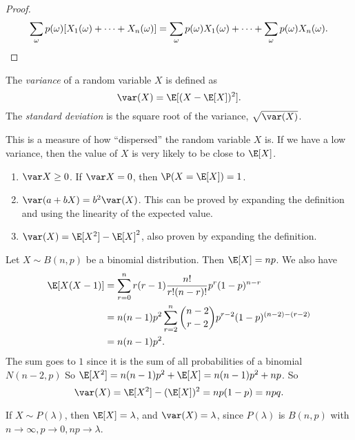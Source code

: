 \documentclass[a4paper]{article}
\begin{document}
\begin{proof}
  \[
    \sum_\omega p(\omega)[X_1(\omega) + \cdots + X_n(\omega)] = \sum_\omega p(\omega)X_1(\omega) + \cdots + \sum_\omega p(\omega) X_n(\omega).\qedhere
  \]
\end{proof}

\begin{defi}
  The \emph{variance} of a random variable $X$ is defined as
  \[
    \var(X) = \E[(X - \E[X])^2].
  \]
  The \emph{standard deviation} is the square root of the variance, $\sqrt{\var(X)}$.
\end{defi}
This is a measure of how ``dispersed'' the random variable $X$ is. If we have a low variance, then the value of $X$ is very likely to be close to $\E[X]$.

\begin{thm}\leavevmode
  \begin{enumerate}
    \item $\var X \geq 0$. If $\var X = 0$, then $\P(X = \E[X]) = 1$.
    \item $\var (a + bX) = b^2 \var(X)$. This can be proved by expanding the definition and using the linearity of the expected value.
    \item $\var(X) = \E[X^2] - \E[X]^2$, also proven by expanding the definition.
  \end{enumerate}
\end{thm}

\begin{eg}
  Let $X\sim B(n, p)$ be a binomial distribution. Then $\E[X] = np$. We also have
  \begin{align*}
    \E[X(X - 1)] &= \sum_{r = 0}^n r(r - 1)\frac{n!}{r!(n - r)!} p^r(1 - p)^{n - r}\\
    &= n(n - 1)p^2\sum_{r = 2}^n \binom{n - 2}{r - 2} p^{r - 2}(1 - p)^{(n - 2) - (r - 2)}\\
    &= n(n - 1)p^2.
  \end{align*}
  The sum goes to $1$ since it is the sum of all probabilities of a binomial $N(n - 2, p)$
  So $\E[X^2] = n(n - 1)p^2 + \E[X] = n(n - 1)p^2 + np$. So
  \[
    \var(X) = \E[X^2] - (\E[X])^2 = np(1 - p) = npq.
  \]
\end{eg}

\begin{eg}
  If $X\sim P(\lambda)$, then $\E[X] = \lambda$, and $\var(X) = \lambda$, since $P(\lambda)$ is $B(n, p)$ with $n\to \infty, p \to 0, np \to \lambda$.
\end{eg}
\end{document}
